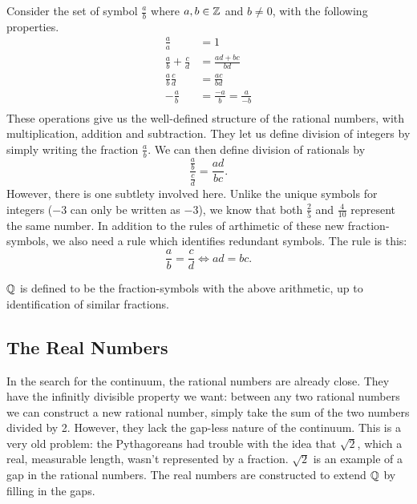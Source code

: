 \documentclass[fleqn]{report}
\begin{document}
Consider the set of symbol $\frac{a}{b}$ where
$a, b \in \mathbb{Z}$ and $b \neq 0$, with the following properties.
\begin{align*}
\frac{a}{a} & = 1 \\
\frac{a}{b} + \frac{c}{d} & = \frac{ad + bc}{bd} \\
\frac{a}{b} \frac{c}{d} & = \frac{ac}{bd} \\
-\frac{a}{b} & = \frac{-a}{b} = \frac{a}{-b}\\
\end{align*}
These operations give us the well-defined structure of the
rational numbers, with multiplication, addition and
subtraction. They let us define division of integers by
simply writing the fraction $\frac{a}{b}$. We can then define
division of rationals by
\begin{equation*}
\frac{\frac{a}{b}}{\frac{c}{d}} = \frac{ad}{bc}.
\end{equation*}
However, there is one subtlety involved here. Unlike the
unique symbols for integers ($-3$ can only be written as $-3$), 
we know that both $\frac{2}{5}$ and $\frac{4}{10}$ represent
the same number. In addition to the rules of arthimetic of
these new fraction-symbols, we also need a rule which
identifies redundant symbols. The rule is this:
\begin{equation*}
\frac{a}{b} = \frac{c}{d} \iff ad = bc.
\end{equation*}

\begin{defn} 
$\mathbb{Q}$ is defined to be the fraction-symbols with the above
arithmetic, up to identification of similar fractions. 
\end{defn}

\subsection{The Real Numbers}
\label{reals}

In the search for the continuum, the rational numbers are
already close. They have the infinitly divisible property we
want: between any two rational numbers we can construct a new
rational number, simply take the sum of the two numbers divided by
2. However, they lack the gap-less nature of the continuum.
This is a very old problem: the Pythagoreans had trouble with
the idea that $\sqrt{2}$, which a real, measurable length,
wasn't represented by a fraction. $\sqrt{2}$ is an example of
a gap in the rational numbers. The real numbers are
constructed to extend $\mathbb{Q}$ by filling in the gaps.
\end{document}
